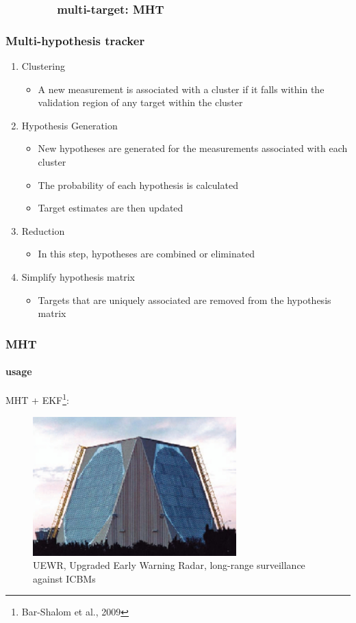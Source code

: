\subsubsection{\ \ \ \ \ \ \ \ multi-target: MHT}
\begin{frame}
\frametitle{Multi-hypothesis tracker}
\logoCSIPCPL\mypagenum
	\begin{enumerate}
	\item {\color{red}Clustering}
		\begin{itemize}
			\item A new measurement is associated with a cluster if it falls within the validation region of any target within the cluster
		\end{itemize}
	\item {\color{red}Hypothesis Generation}
		\begin{itemize} 
			\item New hypotheses are generated for the measurements associated with each cluster
			\item The probability of each hypothesis is calculated
			\item Target estimates are then updated
		\end{itemize}
	\item {\color{red}Reduction}
		\begin{itemize}
			\item In this step, hypotheses are combined or eliminated
		\end{itemize}
	\item {\color{red}Simplify hypothesis matrix}
		\begin{itemize}
			\item Targets that are uniquely associated are removed from the hypothesis matrix
		\end{itemize}
	\end{enumerate}
\end{frame}




\begin{frame}
\frametitle{MHT}
\framesubtitle{usage}
\logoCSIPCPL\mypagenum
	MHT + EKF\footnote{Bar-Shalom et al., 2009}:
	\begin{figure}
		\includegraphics[width=0.7\textwidth]{figs/TRK_MHT_example_UEWR.jpg}
		\caption {UEWR, Upgraded Early Warning Radar, long-range surveillance against ICBMs}
	\end{figure}
\end{frame}







